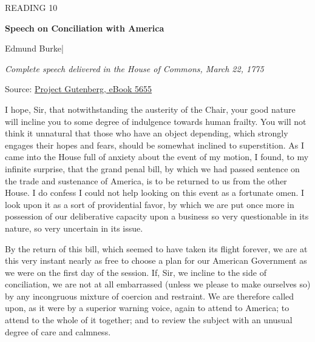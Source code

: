\begingroup

\thispagestyle{fancy}
\label{article-10}
\begingroup\raggedright
\setlength{\parindent}{0pt}
{\fontsize{9}{12}\selectfont\color{headgrey}READING 10\par}
\vspace{4pt}
{\fontsize{24}{30}\selectfont\bfseries Speech on Conciliation with America\par}
\vspace{7pt}
{\fontsize{12}{18}\selectfont Edmund Burke\quad|\par}
\vspace{4pt}
{\fontsize{11}{16}\selectfont\itshape Complete speech delivered in the House of Commons, March 22, 1775\par}
\vspace{4pt}
{\fontsize{9}{12.5}\selectfont\color{headgrey}Source: \href{https://www.gutenberg.org/ebooks/5655}{Project Gutenberg, eBook 5655}\par}
\endgroup
\vspace{6pt}

I hope, Sir, that notwithstanding the austerity of the Chair, your good nature will incline you to some degree of indulgence towards human frailty. You will not think it unnatural that those who have an object depending, which strongly engages their hopes and fears, should be somewhat inclined to superstition. As I came into the House full of anxiety about the event of my motion, I found, to my infinite surprise, that the grand penal bill, by which we had passed sentence on the trade and sustenance of America, is to be returned to us from the other House. I do confess I could not help looking on this event as a fortunate omen. I look upon it as a sort of providential favor, by which we are put once more in possession of our deliberative capacity upon a business so very questionable in its nature, so very uncertain in its issue.\par

By the return of this bill, which seemed to have taken its flight forever, we are at this very instant nearly as free to choose a plan for our American Government as we were on the first day of the session. If, Sir, we incline to the side of conciliation, we are not at all embarrassed (unless we please to make ourselves so) by any incongruous mixture of coercion and restraint. We are therefore called upon, as it were by a superior warning voice, again to attend to America; to attend to the whole of it together; and to review the subject with an unusual degree of care and calmness.\par

